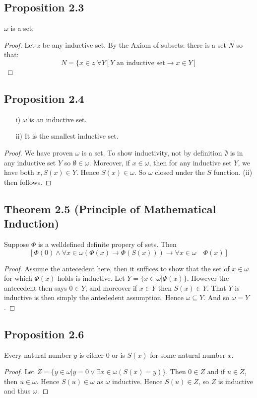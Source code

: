 \documentclass[a4paper, 12pt, twoside]{article}
\begin{document}
\subsection*{Proposition 2.3}
$\omega$ is a set.
\begin{proof}
    Let $z$ be any inductive set. By the Axiom of subsets: there is a set $N$ so that:
    $$N=\{x\in z|\forall Y[Y \text{ an inductive set}\to x\in Y] $$
\end{proof}
\subsection*{Proposition 2.4}
\begin{itemize}
    \item[i)] $\omega$ is an inductive set.
    \item[ii)] It is the smallest inductive set.
\end{itemize}
\begin{proof}
    We have proven $\omega$ is a set. To show inductivity, not by definition $\emptyset$ is in any inductive set $Y$ so $\emptyset\in\omega$. Moreover, if $x\in\omega$, then for any inductive set $Y$, we have both $x,S(x)\in Y$. Hence $S(x)\in\omega$. So $\omega$ closed under the $S$ function. (ii) then follows.
\end{proof}
\subsection*{Theorem 2.5 (Principle of Mathematical Induction)}
Suppose $\Phi$ is a welldefined definite propery of sets. Then
$$[\Phi(0)\wedge\forall x\in\omega(\Phi(x)\to\Phi(S(x)))\to\forall x\in \omega\quad\Phi(x)] $$
\begin{proof}
    Assume the antecedent here, then it suffices to show that the set of $x\in\omega$ for which $\Phi(x)$ holds is inductive. Let $Y=\{x\in\omega|\Phi(x)\}$. However the antecedent then says $0\in Y$; and moreover if $x\in Y$ then $S(x)\in Y$. That $Y$ is inductive is then simply the antededent assumption. Hence $\omega\subseteq Y$. And so $\omega = Y$.
\end{proof}
\subsection*{Proposition 2.6}
Every natural number $y$ is either $0$ or is $S(x)$ for some natural number $x$.
\begin{proof}
    Let $Z=\{y\in\omega|y=0\vee\exists x\in\omega(S(x)=y)\}$. Then $0\in Z$ and if $u\in Z$, then $u\in \omega$. Hence $S(u)\in\omega$ as $\omega$ inductive. Hence $S(u)\in Z$, so $Z$ is inductive and thus $\omega$.
\end{proof}
\end{document}
